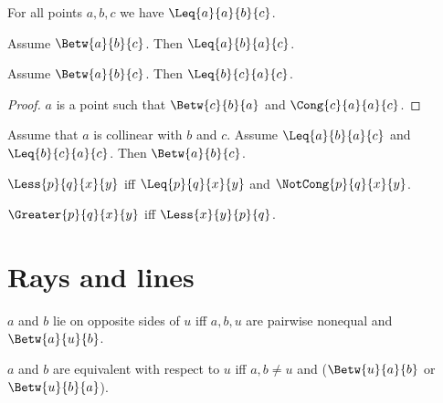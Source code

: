\documentclass[10pt,a4paper,parskip=half,numbers=endperiod,parskip]{scrartcl}
\begin{document}
\begin{forthel}
    \begin{lemma} %
      For all points $a, b, c$ we have $\Leq{a}{a}{b}{c}$.
    \end{lemma}

    \begin{lemma} %
      Assume $\Betw{a}{b}{c}$.
      Then $\Leq{a}{b}{a}{c}$.
    \end{lemma}

    \begin{lemma} %
      Assume $\Betw{a}{b}{c}$.
      Then $\Leq{b}{c}{a}{c}$.
    \end{lemma}
    \begin{proof}
      $a$ is a point such that $\Betw{c}{b}{a}$ and $\Cong{c}{a}{a}{c}$.
    \end{proof}

    \begin{lemma} %
      Assume that $a$ is collinear with $b$ and $c$.
      Assume $\Leq{a}{b}{a}{c}$ and $\Leq{b}{c}{a}{c}$.
      Then $\Betw{a}{b}{c}$.
    \end{lemma}
  \end{forthel}


  \begin{forthel}
    \begin{definition}
      $\Less{p}{q}{x}{y}$ iff $\Leq{p}{q}{x}{y}$ and $\NotCong{p}{q}{x}{y}$.
    \end{definition}

    \begin{definition}
      $\Greater{p}{q}{x}{y}$ iff $\Less{x}{y}{p}{q}$.
    \end{definition}
  \end{forthel}



  \section{Rays and lines}

  \begin{forthel}
    \begin{definition} %
      $a$ and $b$ lie on opposite sides of $u$ iff
      $a, b, u$ are pairwise nonequal and $\Betw{a}{u}{b}$.
    \end{definition}

    \begin{definition} %
      $a$ and $b$ are equivalent with respect to $u$ iff
        $a, b\neq u$ and ($\Betw{u}{a}{b}$ or $\Betw{u}{b}{a}$).
    \end{definition}
  \end{forthel}
\end{document}
